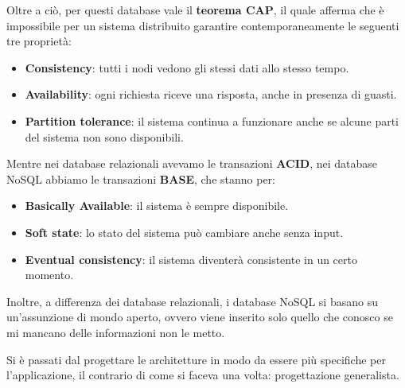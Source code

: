 Oltre a ciò, per questi database vale il \textbf{teorema CAP}, il quale afferma
che è impossibile per un sistema distribuito garantire contemporaneamente le
seguenti tre proprietà:
\begin{itemize}
      \item \textbf{Consistency}: tutti i nodi vedono gli stessi dati allo stesso
            tempo.
      \item \textbf{Availability}: ogni richiesta riceve una risposta, anche in
            presenza di guasti.
      \item \textbf{Partition tolerance}: il sistema continua a funzionare anche
            se alcune parti del sistema non sono disponibili.
\end{itemize}
Mentre nei database relazionali avevamo le transazioni \textbf{ACID}, nei database
NoSQL abbiamo le transazioni \textbf{BASE}, che stanno per:
\begin{itemize}
      \item \textbf{Basically Available}: il sistema è sempre disponibile.
      \item \textbf{Soft state}: lo stato del sistema può cambiare anche senza
            input.
      \item \textbf{Eventual consistency}: il sistema diventerà consistente in un
            certo momento.
\end{itemize}

Inoltre, a differenza dei database relazionali, i database NoSQL si basano su
un'assunzione di mondo aperto, ovvero viene inserito solo quello che conosco se
mi mancano delle informazioni non le metto.

Si è passati dal progettare le architetture in modo da essere più specifiche
per l'applicazione, il contrario di come si faceva una volta: progettazione generalista.
